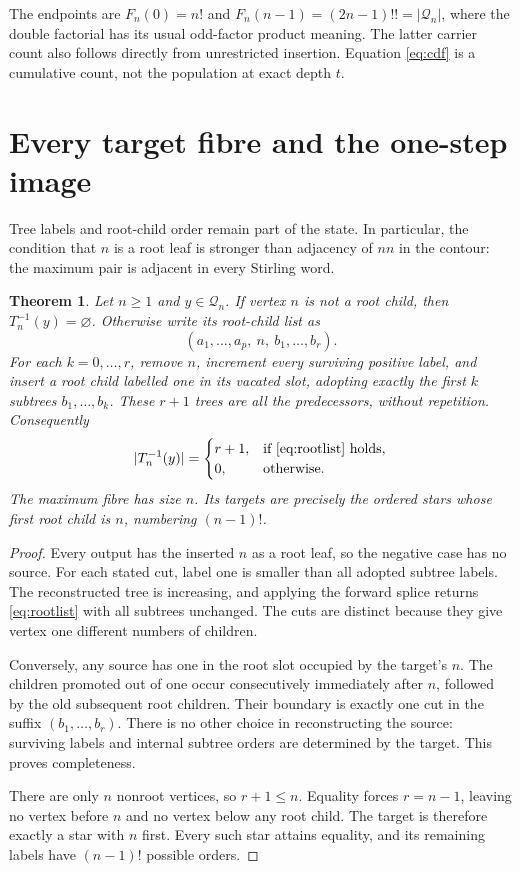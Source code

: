 \documentclass[a4paper,10pt]{amsart}
\newtheorem{theorem}{Theorem}[section]
\theoremstyle{remark}
\newcommand{\Q}{\mathcal Q}
\begin{document}
The endpoints are $F_n(0)=n!$ and
$F_n(n-1)=(2n-1)!!=|\Q_n|$, where the double factorial has its usual
odd-factor product meaning. The latter carrier count also follows
directly from unrestricted insertion. Equation \eqref{eq:cdf} is a
cumulative count, not the population at exact depth $t$.

\section{Every target fibre and the one-step image}

Tree labels and root-child order remain part of the state. In particular,
the condition that $n$ is a root leaf is stronger than adjacency of $nn$
in the contour: the maximum pair is adjacent in every Stirling word.

\begin{theorem}\label{thm:inverse}
Let $n\ge1$ and $y\in\Q_n$. If vertex $n$ is not a root child, then
$T_n^{-1}(y)=\varnothing$. Otherwise write its root-child list as
\begin{equation}\label{eq:rootlist}
 (a_1,\ldots,a_p,\ n,\ b_1,\ldots,b_r).
\end{equation}
For each $k=0,\ldots,r$, remove $n$, increment every surviving positive
label, and insert a root child labelled one in its vacated slot, adopting
exactly the first $k$ subtrees $b_1,\ldots,b_k$. These $r+1$ trees are
all the predecessors, without repetition. Consequently
\begin{equation}\label{eq:fibre}
 |T_n^{-1}(y)|=
 \begin{cases}r+1,&\text{if \eqref{eq:rootlist} holds},\\
 0,&\text{otherwise}.\end{cases}
\end{equation}
The maximum fibre has size $n$. Its targets are precisely the ordered
stars whose first root child is $n$, numbering $(n-1)!$.
\end{theorem}

\begin{proof}
Every output has the inserted $n$ as a root leaf, so the negative case
has no source. For each stated cut, label one is smaller than all adopted
subtree labels. The reconstructed tree is increasing, and applying the
forward splice returns \eqref{eq:rootlist} with all subtrees unchanged.
The cuts are distinct because they give vertex one different numbers
of children.

Conversely, any source has one in the root slot occupied by the target's
$n$. The children promoted out of one occur consecutively immediately
after $n$, followed by the old subsequent root children. Their boundary
is exactly one cut in the suffix $(b_1,\ldots,b_r)$. There is no other
choice in reconstructing the source: surviving labels and internal
subtree orders are determined by the target. This proves completeness.

There are only $n$ nonroot vertices, so $r+1\le n$. Equality forces
$r=n-1$, leaving no vertex before $n$ and no vertex below any root child.
The target is therefore exactly a star with $n$ first. Every such star
attains equality, and its remaining labels have $(n-1)!$ possible orders.
\end{proof}
\end{document}
